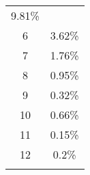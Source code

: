 \documentclass[]{book}
\begin{document}
\begin{longtable}[]{@{}cc@{}}
\begin{minipage}[t]{0.14\columnwidth}\centering\strut
9.81\%
\strut\end{minipage}\tabularnewline
\begin{minipage}[t]{0.10\columnwidth}\centering\strut
6
\strut\end{minipage} &
\begin{minipage}[t]{0.14\columnwidth}\centering\strut
3.62\%
\strut\end{minipage}\tabularnewline
\begin{minipage}[t]{0.10\columnwidth}\centering\strut
7
\strut\end{minipage} &
\begin{minipage}[t]{0.14\columnwidth}\centering\strut
1.76\%
\strut\end{minipage}\tabularnewline
\begin{minipage}[t]{0.10\columnwidth}\centering\strut
8
\strut\end{minipage} &
\begin{minipage}[t]{0.14\columnwidth}\centering\strut
0.95\%
\strut\end{minipage}\tabularnewline
\begin{minipage}[t]{0.10\columnwidth}\centering\strut
9
\strut\end{minipage} &
\begin{minipage}[t]{0.14\columnwidth}\centering\strut
0.32\%
\strut\end{minipage}\tabularnewline
\begin{minipage}[t]{0.10\columnwidth}\centering\strut
10
\strut\end{minipage} &
\begin{minipage}[t]{0.14\columnwidth}\centering\strut
0.66\%
\strut\end{minipage}\tabularnewline
\begin{minipage}[t]{0.10\columnwidth}\centering\strut
11
\strut\end{minipage} &
\begin{minipage}[t]{0.14\columnwidth}\centering\strut
0.15\%
\strut\end{minipage}\tabularnewline
\begin{minipage}[t]{0.10\columnwidth}\centering\strut
12
\strut\end{minipage} &
\begin{minipage}[t]{0.14\columnwidth}\centering\strut
0.2\%
\strut\end{minipage}\tabularnewline
\begin{minipage}[t]{0.10\columnwidth}\centering\strut

\end{minipage}
\end{longtable}
\end{document}
